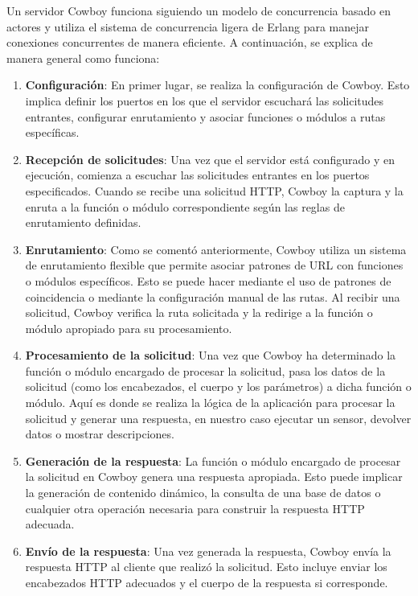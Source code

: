 Un servidor Cowboy funciona siguiendo un modelo de concurrencia basado en actores y utiliza el sistema de concurrencia ligera de Erlang para manejar conexiones concurrentes de manera eficiente. A continuación, se explica de manera general como funciona:

\begin{enumerate}
    \item \textbf{Configuración}: En primer lugar, se realiza la configuración de Cowboy. Esto implica definir los puertos en los que el servidor escuchará las solicitudes entrantes, configurar enrutamiento y asociar funciones o módulos a rutas específicas.
    \item \textbf{Recepción de solicitudes}: Una vez que el servidor está configurado y en ejecución, comienza a escuchar las solicitudes entrantes en los puertos especificados. Cuando se recibe una solicitud HTTP, Cowboy la captura y la enruta a la función o módulo correspondiente según las reglas de enrutamiento definidas.
    \item \textbf{Enrutamiento}: Como se comentó anteriormente, Cowboy utiliza un sistema de enrutamiento flexible que permite asociar patrones de URL con funciones o módulos específicos. Esto se puede hacer mediante el uso de patrones de coincidencia o mediante la configuración manual de las rutas. Al recibir una solicitud, Cowboy verifica la ruta solicitada y la redirige a la función o módulo apropiado para su procesamiento.
    \item \textbf{Procesamiento de la solicitud}: Una vez que Cowboy ha determinado la función o módulo encargado de procesar la solicitud, pasa los datos de la solicitud (como los encabezados, el cuerpo y los parámetros) a dicha función o módulo. Aquí es donde se realiza la lógica de la aplicación para procesar la solicitud y generar una respuesta, en nuestro caso ejecutar un sensor, devolver datos o mostrar descripciones.
    \item \textbf{Generación de la respuesta}: La función o módulo encargado de procesar la solicitud en Cowboy genera una respuesta apropiada. Esto puede implicar la generación de contenido dinámico, la consulta de una base de datos o cualquier otra operación necesaria para construir la respuesta HTTP adecuada.
    \item \textbf{Envío de la respuesta}: Una vez generada la respuesta, Cowboy envía la respuesta HTTP al cliente que realizó la solicitud. Esto incluye enviar los encabezados HTTP adecuados y el cuerpo de la respuesta si corresponde.
\end{enumerate}

